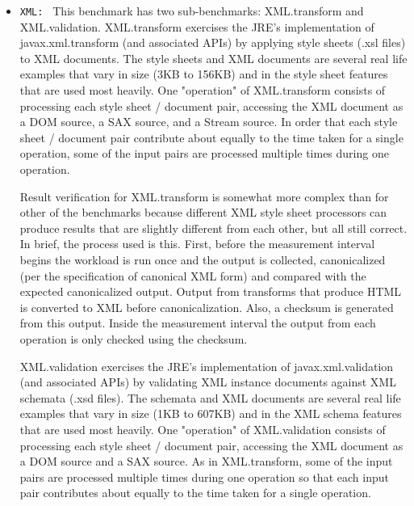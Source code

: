 \begin{itemize}
\item \texttt{XML: } This benchmark has two sub-benchmarks: XML.transform and XML.validation. XML.transform exercises the JRE's implementation of javax.xml.transform (and associated APIs) by applying style sheets (.xsl files) to XML documents. The style sheets and XML documents are several real life examples that vary in size (3KB to 156KB) and in the style sheet features that are used most heavily. One "operation" of XML.transform consists of processing each style sheet / document pair, accessing the XML document as a DOM source, a SAX source, and a Stream source. In order that each style sheet / document pair contribute about equally to the time taken for a single operation, some of the input pairs are processed multiple times during one operation.

Result verification for XML.transform is somewhat more complex than for other of the benchmarks because different XML style sheet processors can produce results that are slightly different from each other, but all still correct. In brief, the process used is this. First, before the measurement interval begins the workload is run once and the output is collected, canonicalized (per the specification of canonical XML form) and compared with the expected canonicalized output. Output from transforms that produce HTML is converted to XML before canonicalization. Also, a checksum is generated from this output. Inside the measurement interval the output from each operation is only checked using the checksum.

XML.validation exercises the JRE's implementation of javax.xml.validation (and associated APIs) by validating XML instance documents against XML schemata (.xsd files). The schemata and XML documents are several real life examples that vary in size (1KB to 607KB) and in the XML schema features that are used most heavily. One "operation" of XML.validation consists of processing each style sheet / document pair, accessing the XML document as a DOM source and a SAX source. As in XML.transform, some of the input pairs are processed multiple times during one operation so that each input pair contributes about equally to the time taken for a single operation. 
\end{itemize}
